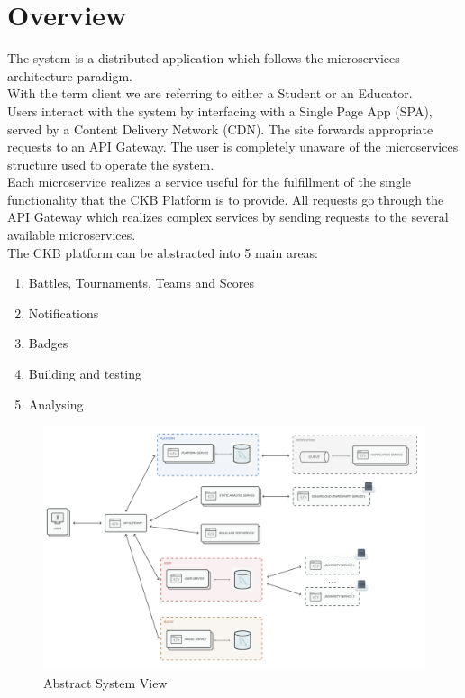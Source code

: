 \section{Overview}
The system is a distributed application which follows the microservices architecture paradigm.\\
With the term client we are referring to either a Student or an Educator.\\
Users interact with the system by interfacing with a Single Page App (SPA), served by a Content Delivery Network (CDN).
The site forwards appropriate requests to an API Gateway.
The user is completely unaware of the microservices structure used to operate the system.\\
Each microservice realizes a service useful for the fulfillment of the single functionality that the CKB Platform is to provide.
All requests go through the API Gateway which realizes complex services by sending requests to the several available microservices.\\
The CKB platform can be abstracted into 5 main areas:
\begin{enumerate}

    \item Battles, Tournaments, Teams and Scores
    \item Notifications
    \item Badges
    \item Building and testing
    \item Analysing

\end{enumerate}

\begin{figure}[H]
      \centering
      \includegraphics[width=\textwidth]{../images/abstract-system-layout.PNG}
      \caption{Abstract System View}
      \label{fig:Abstract System View}
\end{figure}

